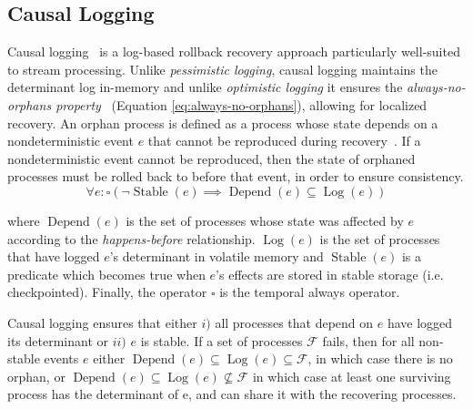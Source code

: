 \documentclass[sigconf]{acmart}
\DeclareMathOperator{\Stable}{Stable}
\DeclareMathOperator{\Depend}{Depend}
\DeclareMathOperator{\Log}{Log}
\begin{document}
\subsection{Causal Logging}
\label{sec:causal_logging}

Causal logging~\cite{alvisi1998message, elnozahy1994manetho} is a log-based rollback recovery approach particularly well-suited to stream processing. 
Unlike \textit{pessimistic logging}, causal logging maintains the determinant log in-memory and unlike
\textit{optimistic logging} it ensures the \textit{always-no-orphans property}~\cite{alvisi1996understanding} (Equation \ref{eq:always-no-orphans}), allowing for localized recovery.
An orphan process is defined as a process whose state depends on a nondeterministic event $e$ that cannot be reproduced during recovery~\cite{elnozahy2002survey}. 
If a nondeterministic event cannot be reproduced, then the state of orphaned processes must be rolled back to before that event, in order to ensure consistency.
\begin{equation}\label{eq:always-no-orphans}
  \forall e: \square(\neg \Stable(e) \implies \Depend(e) \subseteq \Log(e))
\end{equation}

\noindent where $\Depend(e)$ is the set of processes whose state was affected by $e$ according to the \textit{happens-before} relationship. $\Log(e)$ is the set of processes that have logged $e$'s determinant in volatile memory and $\Stable(e)$ is a predicate which becomes true when $e$'s effects are stored in stable storage (i.e. checkpointed). Finally, the operator $\square$ is the temporal always operator. %

Causal logging ensures that either $i)$ all processes that depend on $e$ have logged its determinant or $ii)$ $e$ is stable. If a set of processes $\mathcal{F}$ fails, then for all non-stable events $e$ either $\Depend(e) \subseteq \Log(e) \subseteq \mathcal{F}$, in which case there is no orphan, or $\Depend(e) \subseteq \Log(e) \nsubseteq \mathcal{F}$ in which case at least one surviving process has the determinant of e, and can share it with the recovering processes. %
\end{document}
